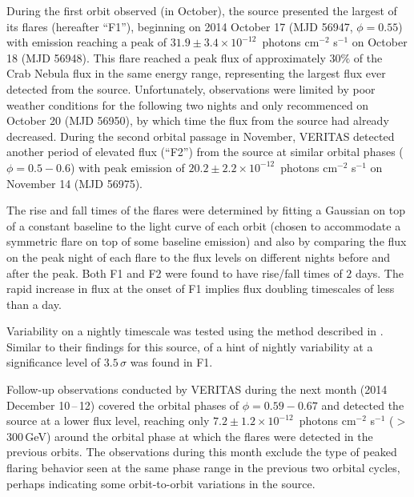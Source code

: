 \documentclass[preprint2]{aastex}
\newcommand{\tapp}{\raisebox{0.5ex}{\texttildelow}}
\newcommand{\pflux}{~photons cm$^{-2}$ s$^{-1}$}
\newcommand{\gev}{\,GeV}
\begin{document}
During the first orbit observed (in October), the source presented the largest of its flares (hereafter ``F1''), beginning on 2014 October 17 (MJD 56947, $\phi = 0.55$) with emission reaching a peak of $31.9 \pm 3.4 \times10^{-12}$\pflux{} on October 18 (MJD 56948). This flare reached a peak flux of approximately $30\%$ of the Crab Nebula flux in the same energy range, representing the largest flux ever detected from the source. Unfortunately, observations were limited by poor weather conditions for the following two nights and only recommenced on October 20 (MJD 56950), by which time the flux from the source had already decreased. During the second orbital passage in November, VERITAS detected another period of elevated flux (``F2'') from the source at similar orbital phases ($\phi = 0.5-0.6$) with peak emission of $20.2 \pm 2.2 \times10^{-12}$\pflux{} on November 14 (MJD 56975).

The rise and fall times of the flares were determined by fitting a Gaussian on top of a constant baseline to the light curve of each orbit (chosen to accommodate a symmetric flare on top of some baseline emission) and also by comparing the flux on the peak night of each flare to the flux levels on different nights before and after the peak. Both F1 and F2 were found to have rise/fall times of \tapp{}$2$ days. The rapid increase in flux at the onset of F1 implies flux doubling timescales of less than a day.

Variability on a nightly timescale was tested using the method described in \citet{2013ApJ...779...88A}. Similar to their findings for this source, of a hint of nightly variability at a significance level of \tapp{}$3.5\,\sigma$ was found in F1.

Follow-up observations conducted by VERITAS during the next month (2014 December 10\,--\,12) covered the orbital phases of $\phi=0.59-0.67$ and detected the source at a lower flux level, reaching only $7.2 \pm 1.2 \times10^{-12}$\pflux{} ($>$300\gev{}) around the orbital phase at which the flares were detected in the previous orbits. The observations during this month exclude the type of peaked flaring behavior seen at the same phase range in the previous two orbital cycles, perhaps indicating some orbit-to-orbit variations in the source.

\end{document}
